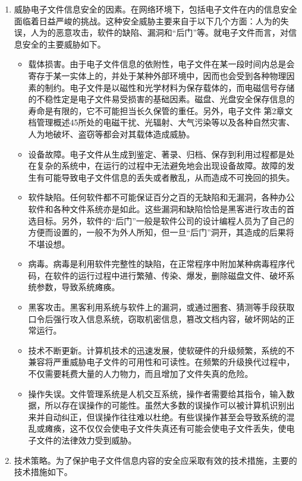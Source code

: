     \begin{enumerate}
    \item 威胁电子文件信息安全的因素。在网络环境下，包括电子文件在内的信息安全面临着日益严峻的挑战。这种安全威胁主要来自于以下几个方面：人为的失误，人为的恶意攻击，软件的缺陷、漏洞和“后门”等。就电子文件而言，对信息安全的主要威胁如下。
        \begin{itemize}
            \item  载体损害。由于电子文件信息的依附性，电子文件在某一段时间内总是会寄存于某一实体上的，并处于某种外部环境中，因而也会受到各种物理因素的制约。电子文件是以磁性和光学材料为保存载体的，而电磁信号存储的不稳性定是电子文件易受损害的基础因素。磁盘、光盘安全保存信息的寿命是有限的，它不可能担当长久保管的重任。另外，电子文件第2章文档管理概述45所处的电磁干扰、光辐射、大气污染等以及各种自然灾害、人为地破坏、盗窃等都会对其载体造成威胁。
            \item  设备故障。电子文件从生成到鉴定、著录、归档、保存到利用过程都是处在复杂的系统中，在运行的过程中无法避免地会出现设备故障。故障的发生有可能导致电子文件信息的丢失或者散乱，从而造成不可挽回的损失。
            \item  软件缺陷。任何软件都不可能保证百分之百的无缺陷和无漏洞，各种办公软件和各种文件系统亦是如此。这些漏洞和缺陷恰恰是黑客进行攻击的首选目标。另外，软件的“后门”一般是软件公司的设计编程人员为了自己的方便而设置的，一般不为外人所知，但一旦“后门”洞开，其造成的后果将不堪设想。
            \item  病毒。病毒是利用软件完整性的缺陷，在正常程序中附加某种病毒程序代码，在软件的运行过程中进行繁殖、传染、爆发，删除磁盘文件、破坏系统参数，导致系统瘫痪。
            \item  黑客攻击。黑客利用系统与软件上的漏洞，或通过圈套、猜测等手段获取口令后强行攻入信息系统，窃取机密信息，篡改文档内容，破坏网站的正常运行。
            \item  技术不断更新。计算机技术的迅速发展，使软硬件的升级频繁，系统的不兼容将严重威胁电子文件的可用性和可读性。在频繁的升级换代过程中，不仅需要耗费大量的人力物力，而且增加了文件失真的危险。
            \item  操作失误。文件管理系统是人机交互系统，操作者需要给其指令，输入数据，所以存在误操作的可能性。虽然大多数的误操作可以被计算机识别出来并自动纠正，但误操作往往难以杜绝。有些误操作甚至会导致系统的混乱或瘫痪，这不仅仅会使电子文件失真还有可能会使电子文件丢失，使电子文件的法律效力受到威胁。
        \end{itemize}

    \item 技术策略。为了保护电子文件信息内容的安全应采取有效的技术措施，主要的技术措施如下。


\end{enumerate}
